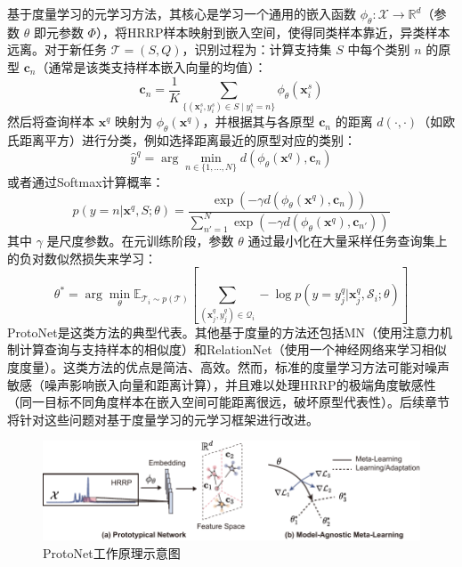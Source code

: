基于度量学习的元学习方法，其核心是学习一个通用的嵌入函数 $\phi_\theta: \mathcal{X} \rightarrow \mathbb{R}^d$（参数 $\theta$ 即元参数 $\Phi$），将HRRP样本映射到嵌入空间，使得同类样本靠近，异类样本远离。对于新任务 $\mathcal{T}=(S, Q)$，识别过程为：计算支持集 $S$ 中每个类别 $n$ 的原型 $\mathbf{c}_n$（通常是该类支持样本嵌入向量的均值）：
\begin{equation}
    \mathbf{c}_n = \frac{1}{K} \sum_{\{(\mathbf{x}_i^s, y_i^s) \in S \mid y_i^s=n\}} \phi_\theta(\mathbf{x}_i^s)
    \label{eq:prototype_calculation}
\end{equation}
然后将查询样本 $\mathbf{x}^q$ 映射为 $\phi_\theta(\mathbf{x}^q)$，并根据其与各原型 $\mathbf{c}_n$ 的距离 $d(\cdot, \cdot)$（如欧氏距离平方）进行分类，例如选择距离最近的原型对应的类别：
\begin{equation}
    \hat{y}^q = \arg\min_{n \in \{1, \dots, N\}} d(\phi_\theta(\mathbf{x}^q), \mathbf{c}_n)
    \label{eq:protonet_prediction_argmin}
\end{equation}
或者通过Softmax计算概率：
\begin{equation}
    p(y=n | \mathbf{x}^q, S; \theta) = \frac{\exp(-\gamma d(\phi_\theta(\mathbf{x}^q), \mathbf{c}_n))}{\sum_{n'=1}^{N} \exp(-\gamma d(\phi_\theta(\mathbf{x}^q), \mathbf{c}_{n'}))}
    \label{eq:protonet_prediction_softmax_gamma} %
\end{equation}
其中 $\gamma$ 是尺度参数。在元训练阶段，参数 $\theta$ 通过最小化在大量采样任务查询集上的负对数似然损失来学习：
\begin{equation}
    \theta^* = \arg\min_{\theta} \mathbb{E}_{\mathcal{T}_i \sim p(\mathcal{T})} \left[ \sum_{(\mathbf{x}_j^q, y_j^q) \in \mathcal{Q}_i} -\log p(y=y_j^q | \mathbf{x}_j^q, \mathcal{S}_i; \theta) \right]
    \label{eq:protonet_meta_objective}
\end{equation}
ProtoNet是这类方法的典型代表。其他基于度量的方法还包括MN（使用注意力机制计算查询与支持样本的相似度）和RelationNet（使用一个神经网络来学习相似度度量）。这类方法的优点是简洁、高效。然而，标准的度量学习方法可能对噪声敏感（噪声影响嵌入向量和距离计算），并且难以处理HRRP的极端角度敏感性（同一目标不同角度样本在嵌入空间可能距离很远，破坏原型代表性）。后续章节将针对这些问题对基于度量学习的元学习框架进行改进。

\begin{figure}[h]
    \centering
    \includegraphics[width=\linewidth]{figures/proto_maml.pdf}
    \caption{ProtoNet工作原理示意图}
    \label{fig:protonet}
\end{figure}

